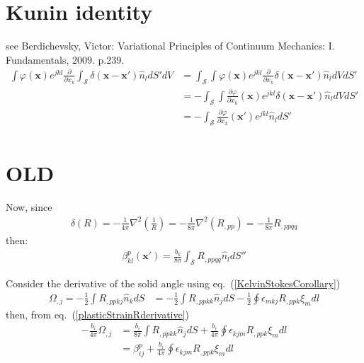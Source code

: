 \section{Kunin identity}
see Berdichevsky, Victor: Variational Principles of Continuum Mechanics: I. Fundamentals, 2009. p.239.
\begin{align}
\int\varphi(\bm x)e^{jkl}\frac{\partial}{\partial x_k}\int_\mathcal{S} \delta(\bm x-\bm x')\hat{n}_ldS'dV&=\int_\mathcal{S} \int\varphi(\bm x)e^{jkl}\frac{\partial}{\partial x_k}\delta(\bm x-\bm x')\hat{n}_ldVdS'\nonumber\\
&=-\int_\mathcal{S} \int\frac{\partial\varphi}{\partial x_k}(\bm x)e^{jkl}\delta(\bm x-\bm x')\hat{n}_ldVdS'\nonumber\\
&=-\int_\mathcal{S} \frac{\partial\varphi}{\partial x_k}(\bm x')e^{jkl}\hat{n}_ldS'\nonumber\\
\end{align}


\section{OLD}

Now, since 
\begin{align}
\delta(R)=-\frac{1}{4\pi}\nabla^2\left(\frac{1}{R}\right)=-\frac{1}{8\pi}\nabla^2(R_{,pp})=-\frac{1}{8\pi}R_{,ppqq}
\end{align}
then:
\begin{align}
\beta^p_{kl}(\bm x')=\frac{b_k}{8\pi}\int_\mathcal{S} R_{,ppqq}\hat{n}_ldS''
\label{plasticStrainRderivative}
\end{align}



Consider the derivative of the solid angle using eq.~(\ref{KelvinStokesCorollary})
\begin{align}
\Omega_{,j}=-\frac{1}{2}\int R_{,ppkj}\hat{n}_kdS&=-\frac{1}{2}\int R_{,ppkk}\hat{n}_jdS-\frac{1}{2}\oint\epsilon_{mkj}R_{,ppk}\xi_mdl
\end{align}
then, from eq.~(\ref{plasticStrainRderivative})
\begin{align}
-\frac{b_i}{4\pi}\Omega_{,j}&=\frac{b_i}{8\pi}\int R_{,ppkk}\hat{n}_jdS+\frac{b_i}{4\pi}\oint\epsilon_{kjm}R_{,ppk}\xi_mdl\nonumber\\
&=\beta^p_{ij}+\frac{b_i}{4\pi}\oint\epsilon_{kjm}R_{,ppk}\xi_mdl
\end{align}

